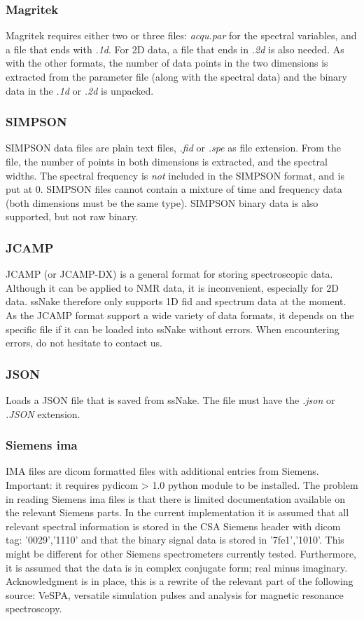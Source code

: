 \documentclass[11pt,a4paper]{article}
\begin{document}
\subsubsection*{Magritek}
Magritek requires either two or three files: \textit{acqu.par} for the spectral variables, and a file that ends with \textit{.1d}. For 2D data, a file that ends in \textit{.2d} is also needed. As with the other formats, the number of data points in the two dimensions is extracted from the parameter file (along with the spectral data) and the binary data in the \textit{.1d} or \textit{.2d} is unpacked.

\subsubsection*{SIMPSON}
SIMPSON data files are plain text files, \textit{.fid} or \textit{.spe} as file extension. From the file, the number of points in both dimensions is extracted, and the spectral widths. The spectral frequency is \textit{not} included in the SIMPSON format, and is put at 0. SIMPSON files cannot contain a mixture of time and frequency data (both dimensions must be the same type). SIMPSON binary data is also supported, but not raw binary.

\subsubsection*{JCAMP}
JCAMP (or JCAMP-DX) is a general format for storing spectroscopic data. Although it can be applied to NMR data, it is inconvenient, especially for 2D data. ssNake therefore only supports 1D fid and spectrum data at the moment. As the JCAMP format support a wide variety of data formats, it depends on the specific file if it can be loaded into ssNake without errors. When encountering errors, do not hesitate to contact us.

\subsubsection*{JSON}
Loads a JSON file that is saved from ssNake. The file must have the \textit{.json} or \textit{.JSON} extension.

\subsubsection*{Siemens ima}
IMA files are dicom formatted files with additional entries from Siemens. Important: it requires pydicom > 1.0 python module to be installed. The problem in reading Siemens ima files is that there is limited documentation available on the relevant Siemens parts. In the current implementation it is assumed that all relevant spectral information is stored in the CSA Siemens header with dicom tag: '0029','1110' and that the binary signal data is stored in '7fe1','1010'. This might be different for other Siemens spectrometers currently tested. Furthermore, it is assumed that the data is in complex conjugate form; real minus imaginary. Acknowledgment is in place, this is a rewrite of the relevant part of the following source: VeSPA, versatile simulation pulses and analysis for magnetic resonance spectroscopy.
\end{document}
